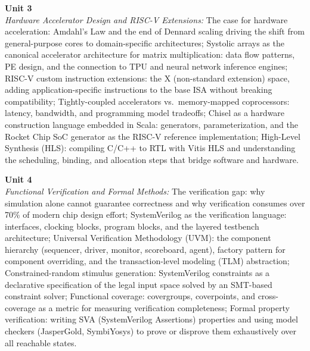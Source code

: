 \vspace{0.3cm}

\noindent\textbf{Unit 3} \\
\textit{Hardware Accelerator Design and RISC-V Extensions:} The case for hardware acceleration: Amdahl's Law and the end of Dennard scaling driving the shift from general-purpose cores to domain-specific architectures; Systolic arrays as the canonical accelerator architecture for matrix multiplication: data flow patterns, PE design, and the connection to TPU and neural network inference engines; RISC-V custom instruction extensions: the X (non-standard extension) space, adding application-specific instructions to the base ISA without breaking compatibility; Tightly-coupled accelerators vs.\ memory-mapped coprocessors: latency, bandwidth, and programming model tradeoffs; Chisel as a hardware construction language embedded in Scala: generators, parameterization, and the Rocket Chip SoC generator as the RISC-V reference implementation; High-Level Synthesis (HLS): compiling C/C++ to RTL with Vitis HLS and understanding the scheduling, binding, and allocation steps that bridge software and hardware.

\vspace{0.3cm}

\noindent\textbf{Unit 4} \\
\textit{Functional Verification and Formal Methods:} The verification gap: why simulation alone cannot guarantee correctness and why verification consumes over 70\% of modern chip design effort; SystemVerilog as the verification language: interfaces, clocking blocks, program blocks, and the layered testbench architecture; Universal Verification Methodology (UVM): the component hierarchy (sequencer, driver, monitor, scoreboard, agent), factory pattern for component overriding, and the transaction-level modeling (TLM) abstraction; Constrained-random stimulus generation: SystemVerilog constraints as a declarative specification of the legal input space solved by an SMT-based constraint solver; Functional coverage: covergroups, coverpoints, and cross-coverage as a metric for measuring verification completeness; Formal property verification: writing SVA (SystemVerilog Assertions) properties and using model checkers (JasperGold, SymbiYosys) to prove or disprove them exhaustively over all reachable states.

\vspace{0.3cm}

